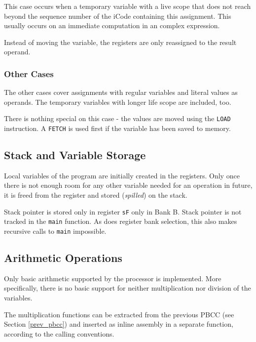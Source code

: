             This case occurs when a temporary variable with a live scope that does not reach beyond the sequence number of the iCode containing this assignment. This usually occurs on an immediate computation in an complex expression.

            Instead of moving the variable, the registers are only reassigned to the result operand.

            \subsubsection{Other Cases}

            The other cases cover assignments with regular variables and literal values as operands. The temporary variables with longer life scope are included, too.

            There is nothing special on this case - the values are moved using the \texttt{LOAD} instruction. A \texttt{FETCH} is used first if the variable has been saved to memory.

        \subsection{Stack and Variable Storage}

        Local variables of the program are initially created in the registers. Only once there is not enough room for any other variable needed for an operation in future, it is freed from the register and stored (\emph{spilled}) on the stack.

        Stack pointer is stored only in register \texttt{sF} only in Bank B. Stack pointer is not tracked in the \texttt{main} function. As does register bank selection, this also makes recursive calls to \texttt{main} impossible.

        \subsection{Arithmetic Operations}

        Only basic arithmetic supported by the processor is implemented. More specifically, there is no basic support for neither multiplication nor division of the variables.

        The multiplication functions can be extracted from the previous PBCC (see Section \ref{prev_pbcc}) and inserted as inline assembly in a separate function, according to the calling conventions.

